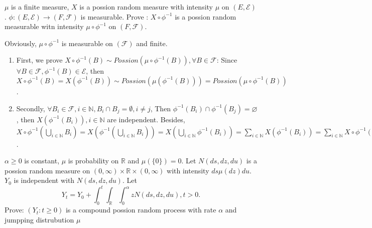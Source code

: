 \documentclass{ctexart}
\begin{document}
\begin{problem}
  \(\mu\) is a finite measure, \(X\) is a possion random measure with intensity \(\mu\) on \((E,\mathscr{E})\).
  \(\phi: (E,\mathscr{E}) \to (F, \mathscr{F})\) is measurable. Prove :
  \(X \circ \phi^{-1}\) is a possion random measurable witn intensity \(\mu \circ \phi^{-1}\) on \((F, \mathscr{F})\).
\end{problem}
\begin{solution}
  Obviously, \(\mu \circ \phi^{-1}\) is measurable on \((\mathscr{F})\) and finite.
  \begin{enumerate}
    \item First, we prove \(X \circ \phi^{-1}(B) \sim Possion(\mu \circ \phi^{-1}(B)), \forall B \in \mathscr{F}\):
      Since \(\forall B \in \mathscr{F}, \phi^{-1}(B) \in \mathscr{E}\), then \(X \circ \phi^{-1}(B)=X(\phi^{-1}(B)) \sim Possion(\mu(\phi^{-1}(B)))=Possion(\mu \circ \phi^{-1}(B))\).
    \item Secondly, \(\forall B_i \in \mathscr{F}, i \in \mathbb{N}, B_i \cap B_j = \emptyset, i \neq j\),
      Then \(\phi^{-1}(B_i) \cap \phi^{-1}(B_j)=\varnothing\), then \(X(\phi^{-1}(B_i)),i \in \mathbb{N}\) are independent.
      Besides, \(X \circ \phi^{-1}(\bigcup_{i \in \mathbb{N}}B_i)=X(\phi^{-1}(\bigcup_{i \in \mathbb{N}}B_i))=X(\bigcup_{i \in \mathbb{N}}\phi^{-1}(B_i))=\sum_{i \in \mathbb{N}}X(\phi^{-1}(B_i))=\sum_{i \in \mathbb{N}}X \circ \phi^{-1}(B_i)\).
  \end{enumerate}
\end{solution}
\begin{problem}\label{pro:4}
  \(\alpha \geq 0\) is constant, \(\mu\) is probability on \(\mathbb{R}\) and \(\mu(\{0\})=0\).
  Let \(N(ds,dz,du)\) is a possion random measure on \((0,\infty)\times\mathbb{R}\times(0,\infty)\) with intensity \(ds \mu(dz)du\).
  \(Y_0\) is independent with \(N(ds,dz,du)\). Let
  \[
    Y_t=Y_0 + \int_{0}^t \int_{\mathbb{R}} \int_{0}^{\alpha} z N(ds,dz,du),t >0.
  \]
  Prove: \((Y_t: t \geq 0)\) is a compound possion random process with rate \(\alpha\) and jumpping distrubution \(\mu\)
\end{problem}
\end{document}

